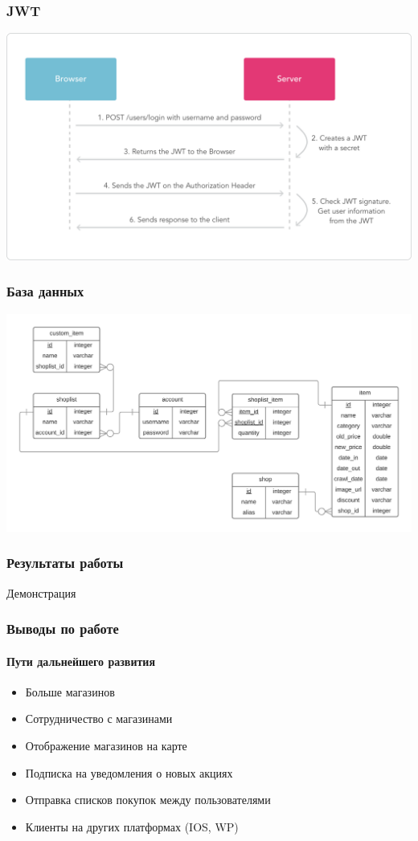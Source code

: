 \documentclass{beamer}
\begin{document}
\begin{frame}
    \frametitle{JWT}
    \begin{center}
      \includegraphics[width=\linewidth]{jwt-diagram}
    \end{center}
\end{frame}

\begin{frame}
    \frametitle{База данных}
    \medskip
    \begin{center}
      \includegraphics[width=\linewidth]{database}
    \end{center}
\end{frame}

\begin{frame}[c]
    \frametitle{Результаты работы}
    \begin{center}
        Демонстрация
    \end{center}
\end{frame}

\begin{frame}
    \frametitle{Выводы по работе}
    \framesubtitle{Пути дальнейшего развития}
    \begin{itemize}
        \item Больше магазинов
        \item Сотрудничество с магазинами
        \item Отображение магазинов на карте
        \item Подписка на уведомления о новых акциях
        \item Отправка списков покупок между пользователями
        \item Клиенты на других платформах (IOS, WP)
    \end{itemize}
\end{frame}
\end{document}
